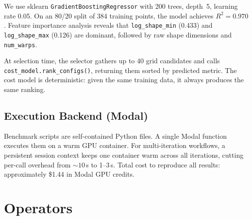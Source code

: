\documentclass[11pt]{article}
\begin{document}
We use sklearn \texttt{GradientBoostingRegressor} with 200 trees, depth~5,
learning rate 0.05. On an 80/20 split of 384 training points, the model achieves
$R^2 = 0.970$. Feature importance analysis reveals that
\texttt{log\_shape\_min} (0.433) and \texttt{log\_shape\_max} (0.126) are
dominant, followed by raw shape dimensions and \texttt{num\_warps}.

At selection time, the selector gathers up to 40 grid candidates and calls
\texttt{cost\_model.rank\_configs()}, returning them sorted by predicted metric.
The cost model is deterministic: given the same training data, it always
produces the same ranking.


\subsection{Execution Backend (Modal)}
\label{sec:modal}

Benchmark scripts are self-contained Python files. A single Modal function
executes them on a warm GPU container. For multi-iteration workflows, a
persistent session context keeps one container warm across all iterations,
cutting per-call overhead from ${\sim}10$\,s to 1--3\,s. Total cost to reproduce
all results: approximately \$1.44 in Modal GPU credits.


\section{Operators}
\label{sec:operators}
\end{document}
